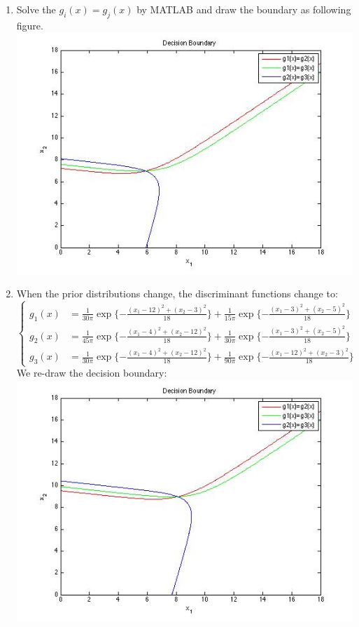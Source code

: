 \documentclass[12pt]{ctexart}
\begin{document}
\begin{enumerate}
\item 
Solve the $g_i(x) = g_j(x)$ by MATLAB and draw the boundary as following figure. \\
\includegraphics[scale=0.8]{hw1_prob1_pic1.jpg} \\

\item 
When the prior distributions change, the discriminant functions change to: \\
$\left\{
  \begin{array}{ll}
    g_1(x)&= \frac{1}{30\pi}  \exp\{-\frac{(x_1-12)^2+(x_2-3)^2}{18}\} + \frac{1}{15\pi}  \exp\{-\frac{(x_1-3)^2+(x_2-5)^2}{18}\}  \\
    g_2(x)&= \frac{1}{45\pi} \exp\{-\frac{(x_1-4)^2+(x_2-12)^2}{18}\} + \frac{1}{30\pi}  \exp\{-\frac{(x_1-3)^2+(x_2-5)^2}{18}\} \\
    g_3(x)&= \frac{1}{30\pi} \exp\{-\frac{(x_1-4)^2+(x_2-12)^2}{18}\} + \frac{1}{90\pi}  \exp\{-\frac{(x_1-12)^2+(x_2-3)^2}{18}\}
  \end{array} 
\right. $ \\
We re-draw the decision boundary: \\ 
\includegraphics[scale=0.8]{hw1_prob1_pic2.jpg} \\
\end{enumerate}
\end{document}

